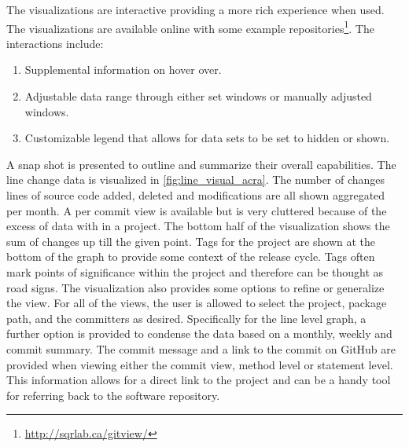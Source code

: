 The visualizations are interactive providing a more rich experience when used. The visualizations are available online with some example repositories\footnote{\url{http://sqrlab.ca/gitview/}}. The interactions include:
\begin{enumerate}
\item Supplemental information on hover over.
\item Adjustable data range through either set windows or manually adjusted windows.
\item Customizable legend that allows for data sets to be set to hidden or shown.
\end{enumerate}
A snap shot is presented to outline and summarize their overall capabilities.  The line change data is visualized in \autoref{fig:line_visual_acra}. The number of changes lines of source code added, deleted and modifications are all shown aggregated per month. A per commit view is available but is very cluttered because of the excess of data with in a project. The bottom half of the visualization shows the sum of changes up till the given point. Tags for the project are shown at the bottom of the graph to provide some context of the release cycle. Tags often mark points of significance within the project and therefore can be thought as road signs. The visualization also provides some options to refine or generalize the view. For all of the views, the user is allowed to select the project, package path, and the committers as desired. Specifically for the line level graph, a further option is provided to condense the data based on a monthly, weekly and commit summary. The commit message and a link to the commit on GitHub are provided when viewing either the commit view, method level or statement level. This information allows for a direct link to the project and can be a handy tool for referring back to the software repository.






